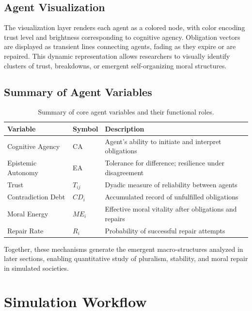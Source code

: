 \documentclass[11pt]{article}
\begin{document}
\subsection{Agent Visualization}

The visualization layer renders each agent as a colored node, with color encoding trust level and brightness corresponding to cognitive agency. Obligation vectors are displayed as transient lines connecting agents, fading as they expire or are repaired.  
This dynamic representation allows researchers to visually identify clusters of trust, breakdowns, or emergent self-organizing moral structures.

\subsection{Summary of Agent Variables}

\begin{table}[H]
\centering
\begin{tabular}{@{}lll@{}}
\toprule
\textbf{Variable} & \textbf{Symbol} & \textbf{Description} \\
\midrule
Cognitive Agency & CA & Agent’s ability to initiate and interpret obligations \\
Epistemic Autonomy & EA & Tolerance for difference; resilience under disagreement \\
Trust & $T_{ij}$ & Dyadic measure of reliability between agents \\
Contradiction Debt & $CD_i$ & Accumulated record of unfulfilled obligations \\
Moral Energy & $ME_i$ & Effective moral vitality after obligations and repairs \\
Repair Rate & $R_i$ & Probability of successful repair attempts \\
\bottomrule
\end{tabular}
\caption{Summary of core agent variables and their functional roles.}
\end{table}

\noindent
Together, these mechanisms generate the emergent macro-structures analyzed in later sections, enabling quantitative study of pluralism, stability, and moral repair in simulated societies.
\section{Simulation Workflow}
\end{document}
